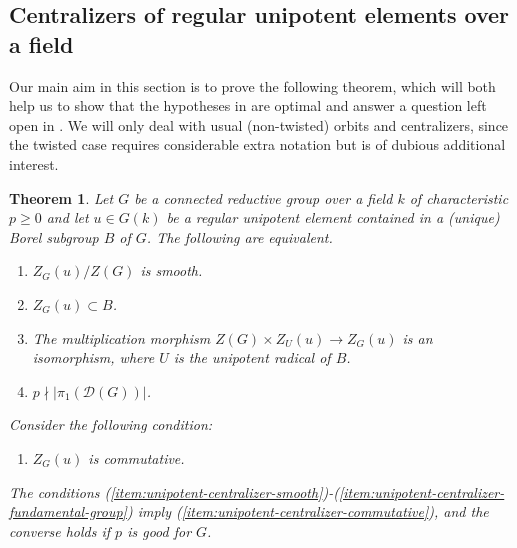 \documentclass[11pt,reqno]{amsart}
\newtheorem{theorem}{Theorem}[section]
\theoremstyle{definition}
\newcommand{\sD}{{\mathscr D}}
\begin{document}
\subsection{Centralizers of regular unipotent elements over a field}\label{subsection:regular-unipotent-centralizers}

Our main aim in this section is to prove the following theorem, which will both help us to show that the hypotheses in \cite[Theorem 5.1]{Integral-Springer} are optimal and answer a question left open in \cite[Remark 2.7]{BRR}. We will only deal with usual (non-twisted) orbits and centralizers, since the twisted case requires considerable extra notation but is of dubious additional interest.

\begin{theorem}\label{theorem:regular-unipotent-centralizer}
Let $G$ be a connected reductive group over a field $k$ of characteristic $p \geq 0$ and let $u \in G(k)$ be a regular unipotent element contained in a (unique) Borel subgroup $B$ of $G$. The following are equivalent.
\begin{enumerate}
    \item\label{item:unipotent-centralizer-smooth} $Z_G(u)/Z(G)$ is smooth.
    \item\label{item:unipotent-centralizer-in-borel} $Z_G(u) \subset B$.
    \item\label{item:unipotent-centralizer-product} The multiplication morphism $Z(G) \times Z_U(u) \to Z_G(u)$ is an isomorphism, where $U$ is the unipotent radical of $B$.
    \item\label{item:unipotent-centralizer-fundamental-group} $p \nmid |\pi_1(\sD(G))|$.
\end{enumerate}
Consider the following condition:
\begin{enumerate}[resume]
	\item\label{item:unipotent-centralizer-commutative} $Z_G(u)$ is commutative.
\end{enumerate}
The conditions (\ref{item:unipotent-centralizer-smooth})-(\ref{item:unipotent-centralizer-fundamental-group}) imply (\ref{item:unipotent-centralizer-commutative}), and the converse holds if $p$ is good for $G$.
\end{theorem}
\end{document}
